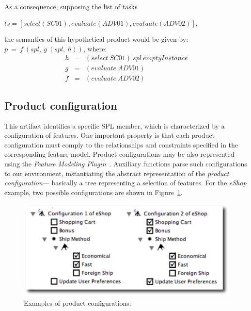 \documentclass{sig-alt-full}
\begin{document}
As a consequence, supposing the list of tasks
 
\begin{center}
$ts=[select(SC01),evaluate(ADV01),evaluate(ADV02)]$,
\end{center}

\noindent 
the semantics of this hypothetical product would be given by: $p\ =\  f\ (spl,\ g\ (spl,\ h))$, where:
\begin{eqnarray*}
h  & = & (select\ SC01)\ spl\ emptyInstance \\
g  & = & (evaluate\ ADV01) \\
f   & = & (evaluate\ ADV02) 
\end{eqnarray*}

\indent

\subsection{Product configuration}\label{subsub:pc}

This artifact identifies a specific SPL member, which is characterized by a
configuration of features. One important property is that each product
configuration must comply to the relationships and constraints specified in the 
corresponding feature model.
Product configurations may be also represented using the \emph{Feature Modeling Plugin}~\cite{Czarnecki:2004aa}. Auxiliary functions parse such configurations to our
environment, instantiating the abstract representation of the \emph{product
configuration}--- basically a tree representing a selection of features. For the
\emph{eShop} example, two possible configurations are shown in
Figure~\ref{fig:product-config-01-02}.

 \begin{figure}[h]
 \begin{center}
  \includegraphics[scale=0.33]{img/pc-04.eps}
   \caption{Examples of product configurations.}
  \label{fig:product-config-01-02}
  \end{center}
\end{figure}
\end{document}
